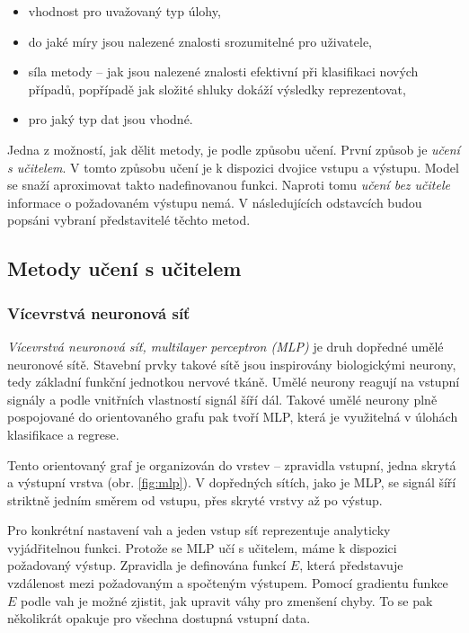 \documentclass[thesis=M,czech]{FITthesis}[2012/06/26]
\begin{document}
\begin{itemize}
\item vhodnost pro uvažovaný typ úlohy,
\item do jaké míry jsou nalezené znalosti srozumitelné pro uživatele,
\item síla metody -- jak jsou nalezené znalosti efektivní při klasifikaci nových případů, popřípadě jak složité shluky dokáží výsledky reprezentovat,
\item pro jaký typ dat jsou vhodné.
\end{itemize}


Jedna z možností, jak dělit metody, je podle způsobu učení. První způsob je \textit{učení s učitelem}. V tomto způsobu učení je k dispozici dvojice vstupu a výstupu. Model se snaží aproximovat takto nadefinovanou funkci. Naproti tomu \textit{učení bez učitele} informace o požadovaném výstupu nemá. V následujících odstavcích budou popsáni vybraní představitelé těchto metod.~\cite{eurokomise}

 \subsection{Metody učení s učitelem}
  \subsubsection*{Vícevrstvá neuronová síť}
    \textit{Vícevrstvá neuronová síť, multilayer perceptron (MLP)} je druh dopředné umělé neuronové sítě.
Stavební prvky takové sítě jsou inspirovány biologickými neurony, tedy základní funkční jednotkou nervové tkáně. Umělé neurony reagují na vstupní signály a podle vnitřních vlastností signál šíří dál. Takové umělé neurony plně pospojované do orientovaného grafu pak tvoří MLP, která je využitelná v úlohách klasifikace a regrese. 

Tento orientovaný graf je organizován do vrstev -- zpravidla vstupní, jedna skrytá a výstupní vrstva (obr. \ref{fig:mlp}). V dopředných sítích, jako je MLP, se signál šíří striktně jedním směrem od vstupu, přes skryté vrstvy až po výstup. 

Pro konkrétní nastavení vah a jeden vstup síť reprezentuje analyticky vyjádřitelnou funkci. Protože se MLP učí s učitelem, máme k dispozici požadovaný výstup. Zpravidla je definována funkcí $E$, která představuje vzdálenost mezi požadovaným a spočteným výstupem. Pomocí gradientu funkce $E$ podle vah je možné zjistit, jak upravit váhy pro zmenšení chyby. To se pak několikrát opakuje pro všechna dostupná vstupní data. 
\end{document}
